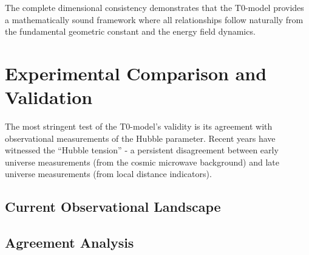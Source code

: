 	The complete dimensional consistency demonstrates that the T0-model provides a mathematically sound framework where all relationships follow naturally from the fundamental geometric constant and the energy field dynamics.
	
	\section{Experimental Comparison and Validation}
	
	The most stringent test of the T0-model's validity is its agreement with observational measurements of the Hubble parameter. Recent years have witnessed the ``Hubble tension'' - a persistent disagreement between early universe measurements (from the cosmic microwave background) and late universe measurements (from local distance indicators).
	
	\subsection{Current Observational Landscape}
	
	\begin{table}[htbp]
		\centering
		\caption{Comparison of T0 prediction with experimental measurements}
		\label{tab:h0_comparison}
	\end{table}
	
	\subsection{Agreement Analysis}
	
